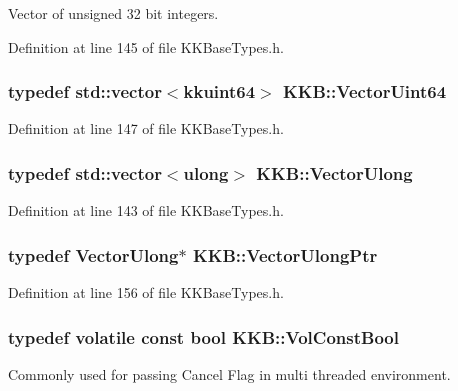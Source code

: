 Vector of unsigned 32 bit integers. 



Definition at line 145 of file K\+K\+Base\+Types.\+h.

\subsubsection[{\texorpdfstring{Vector\+Uint64}{VectorUint64}}]{\setlength{\rightskip}{0pt plus 5cm}typedef std\+::vector$<${\bf kkuint64}$>$ {\bf K\+K\+B\+::\+Vector\+Uint64}}\hypertarget{namespace_k_k_b_a04089b7368e1a306b1c5689ac46ce19a}{}\label{namespace_k_k_b_a04089b7368e1a306b1c5689ac46ce19a}


Definition at line 147 of file K\+K\+Base\+Types.\+h.

\subsubsection[{\texorpdfstring{Vector\+Ulong}{VectorUlong}}]{\setlength{\rightskip}{0pt plus 5cm}typedef std\+::vector$<${\bf ulong}$>$ {\bf K\+K\+B\+::\+Vector\+Ulong}}\hypertarget{namespace_k_k_b_ac8e4b77afddb0db278beb180dae0b6dc}{}\label{namespace_k_k_b_ac8e4b77afddb0db278beb180dae0b6dc}


Definition at line 143 of file K\+K\+Base\+Types.\+h.

\subsubsection[{\texorpdfstring{Vector\+Ulong\+Ptr}{VectorUlongPtr}}]{\setlength{\rightskip}{0pt plus 5cm}typedef {\bf Vector\+Ulong}$\ast$ {\bf K\+K\+B\+::\+Vector\+Ulong\+Ptr}}\hypertarget{namespace_k_k_b_a7122b1e95aed86a78a6b6d378deecd5d}{}\label{namespace_k_k_b_a7122b1e95aed86a78a6b6d378deecd5d}


Definition at line 156 of file K\+K\+Base\+Types.\+h.

\subsubsection[{\texorpdfstring{Vol\+Const\+Bool}{VolConstBool}}]{\setlength{\rightskip}{0pt plus 5cm}typedef volatile const bool {\bf K\+K\+B\+::\+Vol\+Const\+Bool}}\hypertarget{namespace_k_k_b_a7d390f568e2831fb76b86b56c87bf92f}{}\label{namespace_k_k_b_a7d390f568e2831fb76b86b56c87bf92f}
Commonly used for passing Cancel Flag in multi threaded environment. 

